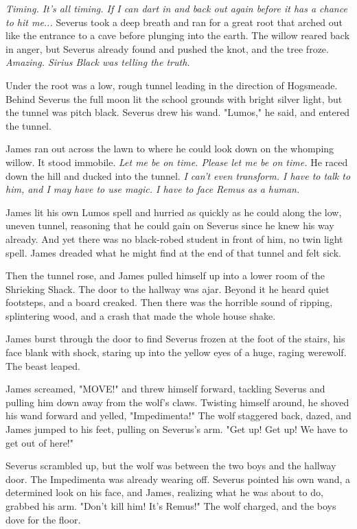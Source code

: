 \documentclass[a4paper,11pt]{article}
\begin{document}
\emph{Timing. It's all timing. If I can dart in and back out again before it has a chance to hit me...} Severus took a deep breath and ran for a great root that arched out like the entrance to a cave before plunging into the earth. The willow reared back in anger, but Severus already found and pushed the knot, and the tree froze. \emph{Amazing. Sirius Black was telling the truth.}

Under the root was a low, rough tunnel leading in the direction of Hogsmeade. Behind Severus the full moon lit the school grounds with bright silver light, but the tunnel was pitch black. Severus drew his wand. "Lumos," he said, and entered the tunnel.

James ran out across the lawn to where he could look down on the whomping willow. It stood immobile. \emph{Let me be on time. Please let me be on time.} He raced down the hill and ducked into the tunnel. \emph{I can't even transform. I have to talk to him, and I may have to use magic. I have to face Remus as a human.}

James lit his own Lumos spell and hurried as quickly as he could along the low, uneven tunnel, reasoning that he could gain on Severus since he knew his way already. And yet there was no black-robed student in front of him, no twin light spell. James dreaded what he might find at the end of that tunnel and felt sick.

Then the tunnel rose, and James pulled himself up into a lower room of the Shrieking Shack. The door to the hallway was ajar. Beyond it he heard quiet footsteps, and a board creaked. Then there was the horrible sound of ripping, splintering wood, and a crash that made the whole house shake.

James burst through the door to find Severus frozen at the foot of the stairs, his face blank with shock, staring up into the yellow eyes of a huge, raging werewolf. The beast leaped.

James screamed, "MOVE!" and threw himself forward, tackling Severus and pulling him down away from the wolf's claws. Twisting himself around, he shoved his wand forward and yelled, "Impedimenta!" The wolf staggered back, dazed, and James jumped to his feet, pulling on Severus's arm. "Get up! Get up! We have to get out of here!"

Severus scrambled up, but the wolf was between the two boys and the hallway door. The Impedimenta was already wearing off. Severus pointed his own wand, a determined look on his face, and James, realizing what he was about to do, grabbed his arm. "Don't kill him! It's Remus!" The wolf charged, and the boys dove for the floor.
\end{document}
